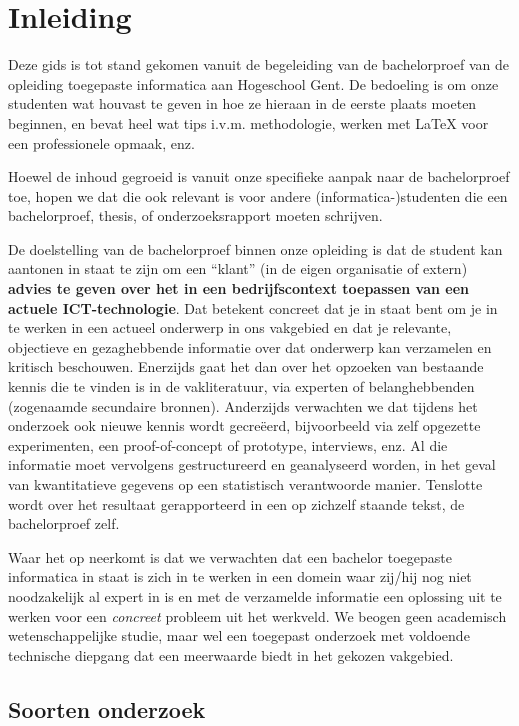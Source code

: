 \chapter*{Inleiding}
\label{ch:inleiding}

Deze gids is tot stand gekomen vanuit de begeleiding van de bachelorproef van de opleiding toegepaste informatica aan Hogeschool Gent. De bedoeling is om onze studenten wat houvast te geven in hoe ze hieraan in de eerste plaats moeten beginnen, en bevat heel wat tips i.v.m. methodologie, werken met {\LaTeX} voor een professionele opmaak, enz.

Hoewel de inhoud gegroeid is vanuit onze specifieke aanpak naar de bachelorproef toe, hopen we dat die ook relevant is voor andere (informatica-)studenten die een bachelorproef, thesis, of onderzoeksrapport moeten schrijven.

De doelstelling van de bachelorproef binnen onze opleiding is dat de student kan aantonen in staat te zijn om een ``klant'' (in de eigen organisatie of extern) \textbf{advies te geven over het in een bedrijfscontext toepassen van een actuele ICT-technologie}. Dat betekent concreet dat je in staat bent om je in te werken in een actueel onderwerp in ons vakgebied en dat je relevante, objectieve en gezaghebbende informatie over dat onderwerp kan verzamelen en kritisch beschouwen. Enerzijds gaat het dan over het opzoeken van bestaande kennis die te vinden is in de vakliteratuur, via experten of belanghebbenden (zogenaamde secundaire bronnen). Anderzijds verwachten we dat tijdens het onderzoek ook nieuwe kennis wordt gecreëerd, bijvoorbeeld via zelf opgezette experimenten, een proof-of-concept of prototype, interviews, enz. Al die informatie moet vervolgens gestructureerd en geanalyseerd worden, in het geval van kwantitatieve gegevens op een statistisch verantwoorde manier. Tenslotte wordt over het resultaat gerapporteerd in een op zichzelf staande tekst, de bachelorproef zelf.

Waar het op neerkomt is dat we verwachten dat een bachelor toegepaste informatica in staat is zich in te werken in een domein waar zij/hij nog niet noodzakelijk al expert in is en met de verzamelde informatie een oplossing uit te werken voor een \emph{concreet} probleem uit het werkveld. We beogen geen academisch wetenschappelijke studie, maar wel een toegepast onderzoek met voldoende technische diepgang dat een meerwaarde biedt in het gekozen vakgebied.

\section{Soorten onderzoek}
\label{sec:soorten-onderzoek}

